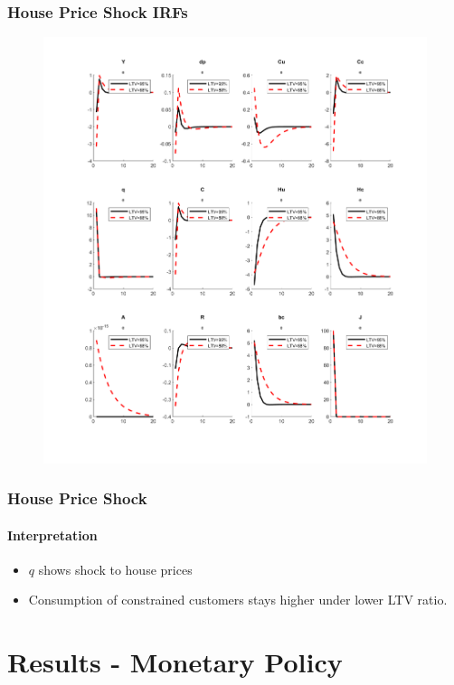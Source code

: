 \documentclass{beamer}
\begin{document}
\begin{frame}
	\frametitle{House Price Shock IRFs}
	
	\begin{figure}[H]\centering
  \includegraphics[scale=0.3]{_e}
\end{figure}
	
\end{frame}

\begin{frame}
	\frametitle{House Price Shock}
	\framesubtitle{Interpretation}	
	
	\begin{itemize}
  \item $q$ shows shock to house prices
  \item Consumption of constrained customers stays higher under lower LTV ratio.
\end{itemize}

	
\end{frame}


\section{Results - Monetary Policy}
\end{document}
